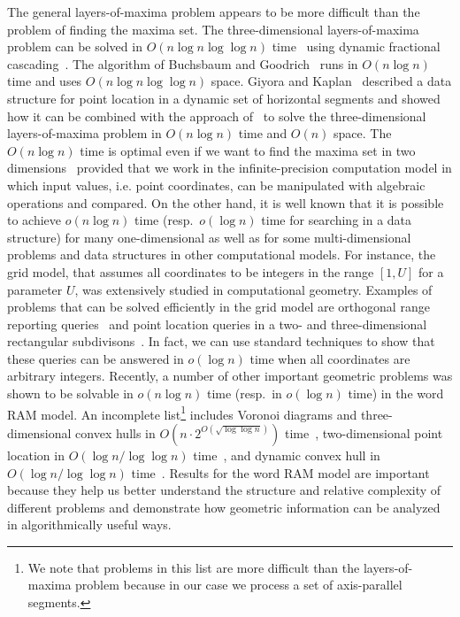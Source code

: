 \documentclass[10pt]{llncs}
\begin{document}
The general layers-of-maxima problem appears to be more difficult than 
the problem of finding the maxima set.  
The three-dimensional layers-of-maxima problem can be solved in 
$O(n \log n \log \log n)$ time~\cite{A92} using dynamic fractional 
cascading~\cite{MN90}. The algorithm  
of Buchsbaum and Goodrich~\cite{BG04} runs in $O(n\log n)$ time 
and uses $O(n\log n \log \log n)$ space. 
Giyora and Kaplan~\cite{GK09} described a data structure for point 
location in a dynamic set of horizontal segments and showed how  it 
can be  combined with the approach of~\cite{BG04} 
to solve the three-dimensional layers-of-maxima problem 
in $O(n\log n)$ time and $O(n)$ space. 
The $O(n\log n)$ time is optimal even if we want to find the maxima set in 
two dimensions~\cite{KLP75} provided that we work 
in the infinite-precision computation 
model in which  input values, i.e. point coordinates, can be manipulated 
with algebraic operations and compared. 
On the other hand, 
it is well known that it is possible to achieve 
$o(n\log n)$ time (resp.\ $o(\log n)$ time for searching in a data structure) 
for many one-dimensional as well as for some multi-dimensional 
problems and data structures in other computational models. 
For instance, the grid model, that assumes all coordinates to be integers
in the range $[1,U]$ for a parameter $U$, was extensively studied in
 computational geometry. Examples of problems that can be solved efficiently 
in the grid model are orthogonal range reporting queries~\cite{O88} 
and point location queries 
in a  two- and three-dimensional rectangular subdivisons~\cite{BKS95}.
In fact, we can use standard techniques 
to show that these  queries can be answered in $o(\log n)$ time when all 
coordinates are arbitrary integers. 
Recently, a number of other important geometric problems was shown to be 
solvable 
in $o(n\log n)$ time (resp.\ in $o(\log n)$ time) in the word RAM model.
An incomplete list\footnote{We note that problems in this list are 
more difficult than the layers-of-maxima problem 
because in our case we process a set of 
axis-parallel segments.} includes Voronoi diagrams and three-dimensional convex 
hulls in $O(n\cdot 2^{O(\sqrt{\log \log n})})$ time~\cite{CP07}, 
two-dimensional point location in $O(\log n/\log \log n)$ 
time~\cite{P06,C06}, and dynamic convex 
hull in $O(\log n/\log \log n)$ time~\cite{DP07}. 
Results for the word RAM model are important because they help us better 
understand 
the structure and relative complexity of different problems and demonstrate 
how geometric information can be analyzed in algorithmically useful ways. 
\end{document}
